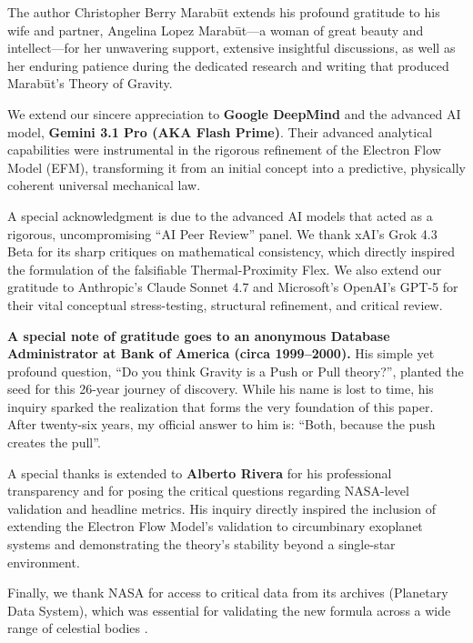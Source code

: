 \documentclass[11pt, a4paper]{article}
\begin{document}
The author Christopher Berry Marab\={u}t extends his profound gratitude to his wife and partner, Angelina Lopez Marab\={u}t---a woman of great beauty and intellect---for her unwavering support, extensive insightful discussions, as well as her enduring patience during the dedicated research and writing that produced Marab\={u}t's Theory of Gravity.

We extend our sincere appreciation to \textbf{Google DeepMind} and the advanced AI model, \textbf{Gemini 3.1 Pro (AKA Flash Prime)}. Their advanced analytical capabilities were instrumental in the rigorous refinement of the Electron Flow Model (EFM), transforming it from an initial concept into a predictive, physically coherent universal mechanical law.

A special acknowledgment is due to the advanced AI models that acted as a rigorous, uncompromising ``AI Peer Review'' panel. We thank xAI's Grok 4.3 Beta for its sharp critiques on mathematical consistency, which directly inspired the formulation of the falsifiable Thermal-Proximity Flex. We also extend our gratitude to Anthropic's Claude Sonnet 4.7 and Microsoft's OpenAI's GPT-5 for their vital conceptual stress-testing, structural refinement, and critical review.

\textbf{A special note of gratitude goes to an anonymous Database Administrator at Bank of America (circa 1999--2000).} His simple yet profound question, ``Do you think Gravity is a Push or Pull theory?'', planted the seed for this 26-year journey of discovery. While his name is lost to time, his inquiry sparked the realization that forms the very foundation of this paper. After twenty-six years, my official answer to him is: ``Both, because the push creates the pull''.

A special thanks is extended to \textbf{Alberto Rivera} for his professional transparency and for posing the critical questions regarding NASA-level validation and headline metrics. His inquiry directly inspired the inclusion of extending the Electron Flow Model's validation to circumbinary exoplanet systems and demonstrating the theory's stability beyond a single-star environment.

Finally, we thank NASA for access to critical data from its archives (Planetary Data System), which was essential for validating the new formula across a wide range of celestial bodies \cite{nasa2024}.
\end{document}

